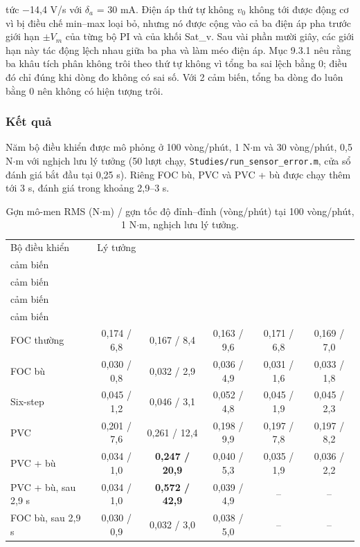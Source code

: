 tức $-$14,4 V/s với $\delta_a$ = 30 mA. Điện áp thứ tự không $v_0$ không tới được động cơ vì bị điều chế min–max loại bỏ, nhưng nó được cộng vào cả ba điện áp pha trước giới hạn $\pm V_m$ của từng bộ PI và của khối Sat\_v. Sau vài phần mười giây, các giới hạn này tác động lệch nhau giữa ba pha và làm méo điện áp. Mục 9.3.1 nêu rằng ba khâu tích phân không trôi theo thứ tự không vì tổng ba sai lệch bằng 0; điều đó chỉ đúng khi dòng đo không có sai số. Với 2 cảm biến, tổng ba dòng đo luôn bằng 0 nên không có hiện tượng trôi.

\subsubsection{Kết quả}\label{sec:9.9.3}

Năm bộ điều khiển được mô phỏng ở 100 vòng/phút, 1 N$\cdot$m và 30 vòng/phút, 0,5 N$\cdot$m với nghịch lưu lý tưởng (50 lượt chạy, \texttt{Studies/run\_sensor\_error.m}, cửa sổ đánh giá bắt đầu tại 0,25 s). Riêng FOC bù, PVC và PVC + bù được chạy thêm tới 3 s, đánh giá trong khoảng 2,9–3 s.

\begin{table}[H]
\centering\small
\caption{Gợn mô-men RMS (N$\cdot$m) / gợn tốc độ đỉnh–đỉnh (vòng/phút) tại 100 vòng/phút, 1 N$\cdot$m, nghịch lưu lý tưởng.}\label{tab:9.8}
\begin{tabularx}{\linewidth}{@{}>{\raggedright\arraybackslash}Xccccc@{}}
\toprule
Bộ điều khiển & Lý tưởng & \begin{tabular}[c]{@{}c@{}}Lệch $\delta_a$,\\3 cảm biến\end{tabular} & \begin{tabular}[c]{@{}c@{}}Lệch $\delta_a$,\\2 cảm biến\end{tabular} & \begin{tabular}[c]{@{}c@{}}Hệ số pha b,\\3 cảm biến\end{tabular} & \begin{tabular}[c]{@{}c@{}}Hệ số pha b,\\2 cảm biến\end{tabular} \\ \midrule
FOC thường & 0,174 / 6,8 & 0,167 / 8,4 & 0,163 / 9,6 & 0,171 / 6,8 & 0,169 / 7,0 \\
FOC bù & 0,030 / 0,8 & 0,032 / 2,9 & 0,036 / 4,9 & 0,031 / 1,6 & 0,033 / 1,8 \\
Six-step & 0,045 / 1,2 & 0,046 / 3,1 & 0,052 / 4,8 & 0,045 / 1,9 & 0,045 / 2,3 \\
PVC & 0,201 / 7,6 & 0,261 / 12,4 & 0,198 / 9,9 & 0,197 / 7,8 & 0,197 / 8,2 \\
PVC + bù & 0,034 / 1,0 & \textbf{0,247 / 20,9} & 0,040 / 5,3 & 0,035 / 1,9 & 0,036 / 2,2 \\
PVC + bù, sau 2,9 s & 0,034 / 1,0 & \textbf{0,572 / 42,9} & 0,039 / 4,9 & – & – \\
FOC bù, sau 2,9 s & 0,030 / 0,9 & 0,032 / 3,0 & 0,038 / 5,0 & – & – \\
\bottomrule
\end{tabularx}
\end{table}


